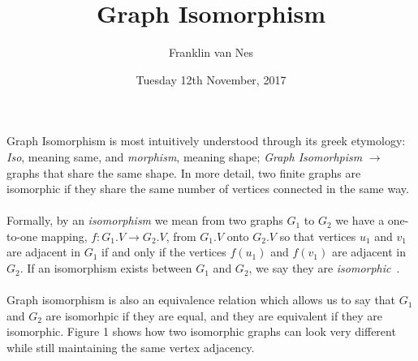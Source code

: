 \documentclass[letterpaper, 11pt]{article}
\begin{document}
\title{Graph Isomorphism}
\author{Franklin van Nes}
\date{Tuesday 12th November, 2017}
\maketitle


    Graph Isomorphism is most intuitively understood through its greek etymology: \textit{Iso}, meaning
     same, and \textit{morphism}, meaning shape; \textit{Graph Isomorhpism} $\rightarrow$ graphs that share the same shape.
    In more detail, two finite graphs are isomorphic if they share the same number of vertices connected in the same way.
    \\\\
    Formally, by an \textit{isomorphism} we mean from two graphs $G_1$ to $G_2$ we have a one-to-one mapping, $f: G_1.V \rightarrow G_2.V$, from $G_1.V$ onto $G_2.V$ so
    that vertices $u_1$ and $v_1$ are adjacent in $G_1$ if and only if the vertices $f(u_1)$ and $f(v_1)$ are adjacent in $G_2$.
    If an isomorphism exists between $G_1$ and $G_2$, we say they are \textit{isomorphic}~\cite{gary-definer}.
    \\\\
     Graph isomorphism is also an equivalence relation which allows us to say that $G_1$ and $G_2$ are isomorhpic if they are equal, and they are equivalent if they are isomorphic.
    Figure 1 shows how two isomorphic graphs can look very different while still maintaining the same vertex adjacency.
\end{document}
